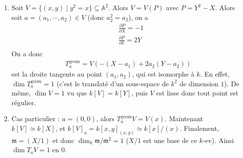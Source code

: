            \begin{expl}
                \begin{enumerate}
                    \item Soit $V = \{(x,y) \mid y^2 = x\} \subseteq \mathbb{A}^2$. Alors $V = V(P)$ avec $P = Y^2 - X$. Alors soit $a = (a_1, \cdots, a_2) \in V$ (donc $a_2^2 = a_2$), on a 
                    \begin{align*}
                        &\frac{\partial P}{\partial X} = -1 \\
                        &\frac{\partial P}{\partial Y} = 2Y \\
                    \end{align*}
                    On a donc 
                    \begin{align*}
                        T_a^\mathrm{geom} = V(-(X - a_1) + 2a_2(Y - a_2))
                    \end{align*}
                    est la droite tangente au point $(a_1, a_2)$, qui est isomorphe à $k$. En effet, $\dim T_a^\mathrm{geom} = 1$ (c'est le translaté d'un sous-espace de $k^2$ de dimension $1$). De même, $\dim V = 1$ vu que $k[V] = k[Y]$, puis $V$ est lisse donc tout point est régulier.
                    \item Cas particulier : $a = (0,0)$, alors $T_a^\mathrm{geom} V = V(x)$. Maintenant $k[V] \simeq k[X]$, et $k[V]_a = k[x,y]_{(x,y)} \simeq k[x]/(x)$. Finalement, $\mathfrak{m} = (X/1)$ et donc $\dim_k \mathfrak{m}/\mathfrak{m}^2 = 1$ ($X/1$ est une base de ce $k$-ev). Ainsi $\dim T_aV = 1$ en $0$.
                \end{enumerate}
            \end{expl}